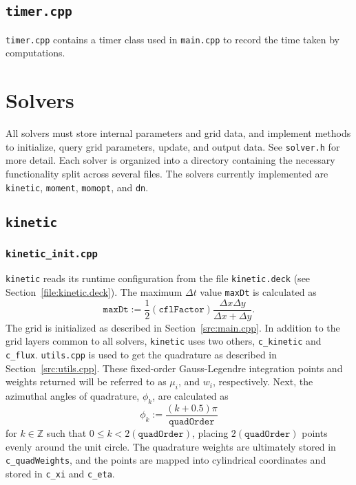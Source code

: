 \documentclass{article}
\newcommand{\main}{\texttt{main.cpp}\xspace}
\newcommand{\utils}{\texttt{utils.cpp}\xspace}
\newcommand{\timer}{\texttt{timer.cpp}\xspace}
\newcommand{\kineticdeck}{\texttt{kinetic.deck}\xspace}
\newcommand{\quadorder}{\ensuremath{\mathtt{quadOrder}}\xspace}
\newcommand{\momopt}{\texttt{momopt}\xspace}
\newcommand{\dn}{\texttt{dn}\xspace}
\newcommand{\Z}{\ensuremath{\mathbb{Z}}\xspace}
\newcommand{\assign}{\ensuremath{\mathrel{\texttt{:=}}}}
\newcommand{\kinetic}{\texttt{kinetic}\xspace}
\newcommand{\moment}{\texttt{moment}\xspace}
\begin{document}
\subsection{\timer}
\label{src:timer.cpp}
\timer contains a timer class used in \main to record the time taken by computations.

\section{Solvers}
\label{solver}
All solvers must store internal parameters and grid data, and implement methods to
initialize, query grid parameters, update, and output data. See \texttt{solver.h}
for more detail. Each solver is organized into a directory containing the necessary
functionality split across several files. The solvers currently implemented
are \kinetic, \moment, \momopt, and \dn.

\subsection{\kinetic}
\label{solver:kinetic}
\subsubsection{\texttt{kinetic\_init.cpp}}
\label{src:kinetic_init.cpp}
\kinetic reads its runtime configuration from the file \kineticdeck
(see Section~\ref{file:kinetic.deck}). The maximum $\Delta t$ value \texttt{maxDt}
is calculated as
\begin{equation} %
    \mathtt{maxDt} \assign \frac{1}{2} (\mathtt{cflFactor})
        \frac{\Delta x \Delta y}{\Delta x + \Delta y}.
\end{equation}
The grid is initialized as described in Section~\ref{src:main.cpp}. In addition to
the grid layers common to all solvers, \kinetic uses two others, \texttt{c\_kinetic}
and \texttt{c\_flux}. \utils is used
to get the quadrature as described in Section~\ref{src:utils.cpp}. These fixed-order
Gauss-Legendre integration points and weights returned will be referred to as $\mu_i$,
and $w_i$, respectively. Next, the
azimuthal angles of quadrature, $\phi_k$, are calculated as
\begin{equation}
    \phi_k \assign \frac{(k + 0.5)\pi}{\quadorder}
\end{equation}
for $k \in \Z$ such that $0 \leq k < 2(\quadorder)$,
placing $2(\quadorder)$ points evenly around the unit circle.
The quadrature weights are ultimately stored in
\texttt{c\_quadWeights}, and the points are mapped into cylindrical coordinates
and stored in \texttt{c\_xi} and \texttt{c\_eta}.
\end{document}
